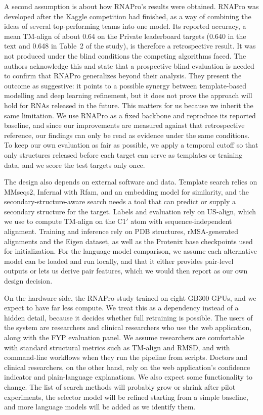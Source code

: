 \documentclass{FastFyp}
\begin{document}
A second assumption is about how RNAPro's results were obtained. RNAPro was developed after the Kaggle competition had finished, as a way of combining the ideas of several top-performing teams into one model. Its reported accuracy, a mean TM-align of about 0.64 on the Private leaderboard targets (0.640 in the text and 0.648 in Table~2 of the study), is therefore a retrospective result. It was not produced under the blind conditions the competing algorithms faced. The authors acknowledge this and state that a prospective blind evaluation is needed to confirm that RNAPro generalizes beyond their analysis. They present the outcome as suggestive: it points to a possible synergy between template-based modelling and deep learning refinement, but it does not prove the approach will hold for RNAs released in the future. This matters for us because we inherit the same limitation. We use RNAPro as a fixed backbone and reproduce its reported baseline, and since our improvements are measured against that retrospective reference, our findings can only be read as evidence under the same conditions. To keep our own evaluation as fair as possible, we apply a temporal cutoff so that only structures released before each target can serve as templates or training data, and we score the test targets only once.

The design also depends on external software and data. Template search relies on MMseqs2, Infernal with Rfam, and an embedding model for similarity, and the secondary-structure-aware search needs a tool that can predict or supply a secondary structure for the target. Labels and evaluation rely on US-align, which we use to compute TM-align on the C1$'$ atom with sequence-independent alignment. Training and inference rely on PDB structures, rMSA-generated alignments and the Eigen dataset, as well as the Protenix base checkpoints used for initialization. For the language-model comparison, we assume each alternative model can be loaded and run locally, and that it either provides pair-level outputs or lets us derive pair features, which we would then report as our own design decision.

On the hardware side, the RNAPro study trained on eight GB300 GPUs, and we expect to have far less compute. We treat this as a dependency instead of a hidden detail, because it decides whether full retraining is possible. The users of the system are researchers and clinical researchers who use the web application, along with the FYP evaluation panel. We assume researchers are comfortable with standard structural metrics such as TM-align and RMSD, and with command-line workflows when they run the pipeline from scripts. Doctors and clinical researchers, on the other hand, rely on the web application's confidence indicator and plain-language explanations. We also expect some functionality to change. The list of search methods will probably grow or shrink after pilot experiments, the selector model will be refined starting from a simple baseline, and more language models will be added as we identify them.
\end{document}
